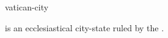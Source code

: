 \documentclass{stex}
\begin{document}
\begin{smodule}{vatican-city}
\begin{sparagraph}[style=symdoc]
 is an ecclesiastical city-state ruled by the .
\end{sparagraph}
\end{smodule}
\end{document}
